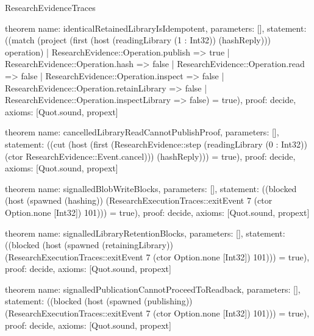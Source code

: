 \begin{lexlean}{ResearchEvidenceTraces}
\begin{semanticmodule}
theorem{
 name: identicalRetainedLibraryIsIdempotent,
 parameters: [],
 statement: ((match (project (first (host (readingLibrary (1 : Int32)) (hashReply))) operation) | ResearchEvidence::Operation.publish => true | ResearchEvidence::Operation.hash => false | ResearchEvidence::Operation.read => false | ResearchEvidence::Operation.inspect => false | ResearchEvidence::Operation.retainLibrary => false | ResearchEvidence::Operation.inspectLibrary => false) = true),
 proof: decide{},
 axioms: [Quot.sound, propext]
}

theorem{
 name: cancelledLibraryReadCannotPublishProof,
 parameters: [],
 statement: ((cut (host (first (ResearchEvidence::step (readingLibrary (0 : Int32)) (ctor ResearchEvidence::Event.cancel))) (hashReply))) = true),
 proof: decide{},
 axioms: [Quot.sound, propext]
}


theorem{
 name: signalledBlobWriteBlocks,
 parameters: [],
 statement: ((blocked (host (spawned (hashing)) (ResearchExecutionTraces::exitEvent 7 (ctor Option.none [Int32]) 101))) = true),
 proof: decide{},
 axioms: [Quot.sound, propext]
}

theorem{
 name: signalledLibraryRetentionBlocks,
 parameters: [],
 statement: ((blocked (host (spawned (retainingLibrary)) (ResearchExecutionTraces::exitEvent 7 (ctor Option.none [Int32]) 101))) = true),
 proof: decide{},
 axioms: [Quot.sound, propext]
}

theorem{
 name: signalledPublicationCannotProceedToReadback,
 parameters: [],
 statement: ((blocked (host (spawned (publishing)) (ResearchExecutionTraces::exitEvent 7 (ctor Option.none [Int32]) 101))) = true),
 proof: decide{},
 axioms: [Quot.sound, propext]
}

\end{semanticmodule}
\end{lexlean}
